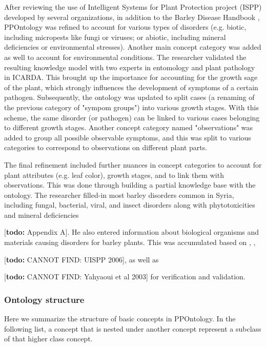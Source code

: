\documentclass{frontiersSCNS} %
\newcommand{\todo}[1]{
  \rule{0pt}{0pt}\marginpar{{\color{blue}\rule{1ex}{1ex}}}
  {[\textbf{\color{blue}todo:} #1]}}
\begin{document}
After reviewing the use of Intelligent Systems for Plant Protection project (ISPP) developed by several organizations, in addition to the Barley Disease Handbook \cite{neate2010barley}, PPOntology was refined to account for various types of disorders (e.g. biotic, including micropests like fungi or viruses; or abiotic, including mineral deficiencies or environmental stresses). Another main concept category was added as well to account for environmental conditions. The researcher validated the resulting knowledge model with two experts in entomology and plant pathology in ICARDA. This brought up the importance for accounting for the growth sage of the plant, which strongly influences the development of symptoms of a certain pathogen. Subsequently, the ontology was updated to split cases (a renaming of the previous category of "sympom groups") into various growth stages. With this scheme, the same disorder (or pathogen) can be linked to various cases belonging to different growth stages. Another concept category named "observations" was added to group all possible observable symptoms, and this was split to various categories to correspond to observations on different plant parts.

The final refinement included further nuances in concept categories to account for plant attributes (e.g. leaf color), growth stages, and to link them with observations. This was done through building a partial knowledge base with the ontology. The researcher filled-in most barley disorders common in Syria, including fungal, bacterial, viral, and insect disorders along with phytotoxicities and mineral deficiencies \todo{Appendix A}. He also entered information about biological organisms and materials causing disorders for barley plants. This was accumulated based on \cite{berkey1992storytelling}, \cite{neate2010barley}, \todo{CANNOT FIND: UISPP 2006}, as well as \todo{CANNOT FIND: Yahyaoui et al 2003}  for verification and validation.

\subsubsection{Ontology structure}
Here we summarize the structure of basic concepts in PPOntology. In the following list, a concept that is nested under another concept represent a subclass of that higher class concept.
\end{document}
